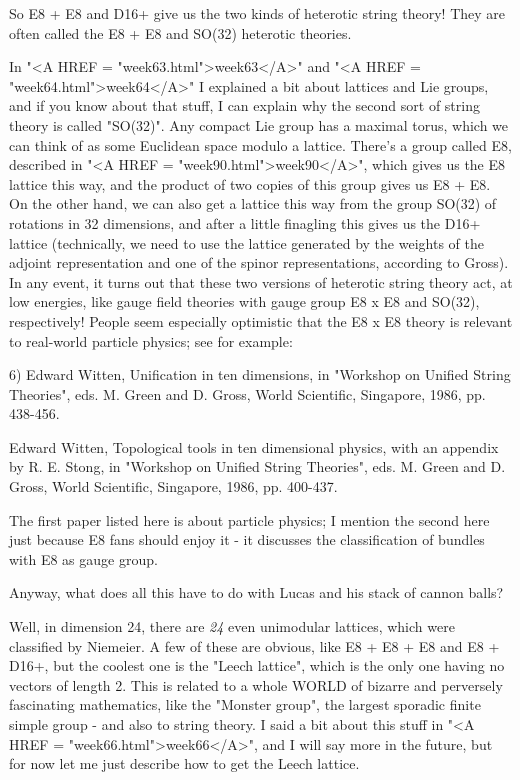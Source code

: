 So E8 + E8 and D16+ give us the two kinds of heterotic string 
theory!  They are often called the E8 + E8 and SO(32) heterotic
theories.  

In "<A HREF = "week63.html">week63</A>" and "<A HREF = "week64.html">week64</A>" I explained a bit about lattices and Lie
groups, and if you know about that stuff, I can explain why the
second sort of string theory is called "SO(32)".  Any compact
Lie group has a maximal torus, which we can think of as some Euclidean
space modulo a lattice.  There's a group called E8, described in
"<A HREF = "week90.html">week90</A>", which gives us the E8 lattice this way, and the product
of two copies of this group gives us E8 + E8.  On the other hand, we
can also get a lattice this way from the group SO(32) of rotations in 
32 dimensions, and after a little finagling this
gives us the D16+ lattice (technically, we need to use the lattice
generated by the weights of the adjoint representation and one of the
spinor representations, according to Gross).  
In any event, it turns out that these
two versions of heterotic string theory act, at low energies, like
gauge field theories with gauge group E8 x E8 and SO(32), respectively!
People seem especially optimistic that the E8 x E8 theory is 
relevant to real-world particle physics; see for example:

6) Edward Witten, Unification in ten dimensions, in "Workshop on 
Unified String Theories", eds. M. Green and D. Gross, World Scientific,
Singapore, 1986, pp. 438-456.

Edward Witten, Topological tools in ten dimensional physics, with
an appendix by R. E. Stong, in "Workshop on Unified String Theories", 
eds. M. Green and D. Gross, World Scientific, Singapore, 1986, pp. 
400-437.

The first paper listed here is about particle physics; I mention 
the second here just because E8 fans should enjoy it - it discusses
the classification of bundles with E8 as gauge group.

Anyway, what does all this have to do with Lucas and his stack
of cannon balls?

Well, in dimension 24, there are \emph{24} even unimodular lattices,
which were classified by Niemeier.  A few of these are obvious, like 
E8 + E8 + E8 and E8 + D16+, but the coolest one is the "Leech 
lattice", which is the only one having no vectors of length 2.  
This is related to a whole WORLD of bizarre and perversely fascinating
mathematics, like the "Monster group", the largest sporadic
 finite simple 
group - and also to string theory.  I said a bit about this stuff
in "<A HREF = "week66.html">week66</A>", and I will say more in the future, but for now let
me just describe how to get the Leech lattice.


